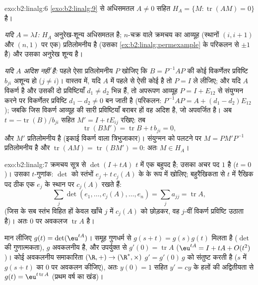\begin{solution}{exo:b2:linalg:6}
\cref{exo:b2:linalg:9} से अधिसमतल $A \neq 0$ सहित $H_A = \{M :
\operatorname{tr}(AM) = 0\}$ है।

\emph{यदि $A = \lambda I$:} $H_A$ अनुरेख-शून्य अधिसमतल है; $n$-चक्र वाले क्रमचय का
आव्यूह (स्थानों $(i, i+1)$ और $(n, 1)$ पर एक) प्रतिलोमनीय है (उसका  \cref{ex:b2:linalg:permexample} के
परिकलन से $\pm 1$ है) और उसका अनुरेख शून्य है।

\emph{यदि $A$ अदिश नहीं है:} पहले ऐसा प्रतिलोमनीय $P$ खोजिए कि $B = P^{-1}AP$ की
कोई विकर्णेतर प्रविष्टि $b_{ji}$ अशून्य हो ($j \neq
i$)। वास्तव में, यदि $A$ में
पहले से ऐसी कोई है तो $P = I$ ले लीजिए; और यदि $A$ विकर्ण है और उसकी दो
प्रविष्टियाँ $d_1 \neq d_2$ भिन्न हैं, तो अपरूपण आव्यूह $P = I + E_{12}$ से संयुग्मन करने पर
विकर्णेतर प्रविष्टि $d_1 - d_2 \neq 0$ बन जाती है (परिकलन: $P^{-1}AP = A + (d_1 - d_2)E_{12}$); जबकि जिस विकर्ण
आव्यूह की सारी प्रविष्टियाँ बराबर हों वह अदिश है, जो अपवर्जित है। अब
$t =
-\operatorname{tr}(B)/b_{ji}$ सहित $M' = I + tE_{ij}$ रखिए: तब
\[
\operatorname{tr}(BM') = \operatorname{tr} B + t\,b_{ji} = 0,
\]
और $M'$ प्रतिलोमनीय है (इकाई विकर्ण वाला त्रिभुजाकार)। संयुग्मन को
पलटने पर $M = PM'P^{-1}$ प्रतिलोमनीय है और $\operatorname{tr}(AM) = \operatorname{tr}(BM') = 0$: अतः $M \in H_A$।
\end{solution}

\begin{solution}{exo:b2:linalg:7}
क्रमचय सूत्र से $\det(I + tA)$ $t$ में एक बहुपद है; उसका अचर पद $1$ है ($t = 0$)।
उसका $t$-गुणांक: $\det$ को स्तंभों $e_j + t\,c_j(A)$ के  के रूप में
खोलिए; बहुरैखिकता से $t$ में रैखिक पद ठीक एक $e_j$ के स्थान पर $c_j(A)$ रखते
हैं:
\[
\sum_{j} \det(e_1, \dots, c_j(A), \dots, e_n)
= \sum_j a_{jj} = \operatorname{tr} A ,
\]
(जिस  के सब स्तंभ विहित हों केवल खाँचे $j$ में $c_j(A)$ को छोड़कर,
वह $j$-वीं विकर्ण प्रविष्टि उठाता है)। अतः $0$ पर अवकलज $\operatorname{tr} A$ है।

मान लीजिए $g(t) = \det(\eu^{tA})$। समूह गुणधर्म से $g(s + t) =
g(s)g(t)$ मिलता है ($\det$ की गुणात्मकता), $g$
अवकलनीय है, और उपर्युक्त से $g'(0) = \operatorname{tr} A$ ($\eu^{tA} = I + tA +
O(t^2)$)। कोई अवकलनीय समाकारिता $(\R, +) \to (\R^*, \times)$ $g' = g'(0)\,g$
को संतुष्ट करती है ($s$ में $g(s+t)$ का $0$ पर अवकलन कीजिए), अतः $y(0) = 1$
सहित $y' = cy$ के हलों की अद्वितीयता से $g(t) = \eu^{t\operatorname{tr} A}$ (प्रथम वर्ष का खंड)।
\end{solution}

